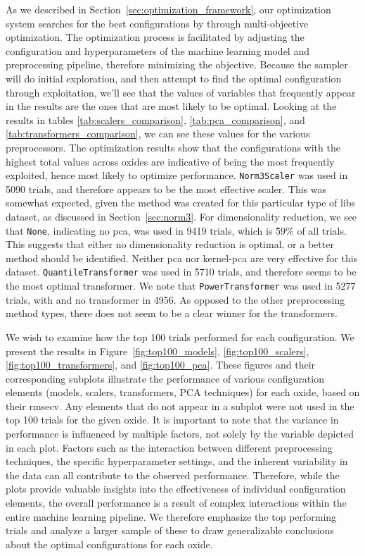 As we described in Section~\ref{sec:optimization_framework}, our optimization system searches for the best configurations by through multi-objective optimization.
The optimization process is facilitated by adjusting the configuration and hyperparameters of the machine learning model and preprocessing pipeline, therefore minimizing the objective.
Because the sampler will do initial exploration, and then attempt to find the optimal configuration through exploitation, we'll see that the values of variables that frequently appear in the results are the ones that are most likely to be optimal.
Looking at the results in tables \ref{tab:scalers_comparison}, \ref{tab:pca_comparison}, and \ref{tab:transformers_comparison}, we can see these values for the various preprocessors.
The optimization results show that the configurations with the highest total values across oxides are indicative of being the most frequently exploited, hence most likely to optimize performance. 
\texttt{Norm3Scaler} was used in 5090 trials, and therefore appears to be the most effective scaler.
This was somewhat expected, given the method was created for this particular type of \gls{libs} dataset, as discussed in Section~\ref{sec:norm3}.
For dimensionality reduction, we see that \texttt{None}, indicating no \gls{pca}, was used in 9419 trials, which is \~59\% of all trials.
This suggests that either no dimensionality reduction is optimal, or a better method should be identified.
Neither \gls{pca} nor \gls{kernel-pca} are very effective for this dataset.
\texttt{QuantileTransformer} was used in 5710 trials, and therefore seems to be the most optimal transformer.
We note that \texttt{PowerTransformer} was used in 5277 trials, with and no transformer in 4956. As opposed to the other preprocessing method types, there does not seem to be a clear winner for the transformers.



We wish to examine how the top 100 trials performed for each configuration.
We present the results in Figure~\ref{fig:top100_models}, \ref{fig:top100_scalers}, \ref{fig:top100_transformers}, and \ref{fig:top100_pca}.
These figures and their corresponding subplots illustrate the performance of various configuration elements (models, scalers, transformers, PCA techniques) for each oxide, based on their \gls{rmsecv}.
Any elements that do not appear in a subplot were not used in the top 100 trials for the given oxide.
It is important to note that the variance in performance is influenced by multiple factors, not solely by the variable depicted in each plot.
Factors such as the interaction between different preprocessing techniques, the specific hyperparameter settings, and the inherent variability in the data can all contribute to the observed performance.
Therefore, while the plots provide valuable insights into the effectiveness of individual configuration elements, the overall performance is a result of complex interactions within the entire machine learning pipeline.
We therefore emphasize the top performing trials and analyze a larger sample of these to draw generalizable conclusions about the optimal configurations for each oxide.

